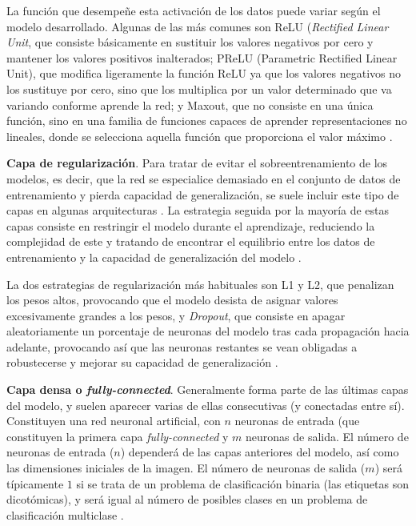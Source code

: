 La función que desempeñe esta activación de los datos puede variar según el modelo desarrollado. Algunas de las más comunes son ReLU (\textit{Rectified Linear Unit}, que consiste básicamente en sustituir los valores negativos por cero y mantener los valores positivos inalterados; PReLU (Parametric Rectified Linear Unit), que modifica ligeramente la función ReLU ya que los valores negativos no los sustituye por cero, sino que los multiplica por un valor determinado que va variando conforme aprende la red; y Maxout, que no consiste en una única función, sino en una familia de funciones capaces de aprender representaciones no lineales, donde se selecciona aquella función que proporciona el valor máximo \cite{cnn:gu, cnn:cheatsheet}.

\textbf{Capa de regularización}. Para tratar de evitar el sobreentrenamiento de los modelos, es decir, que la red se especialice demasiado en el conjunto de datos de entrenamiento y pierda capacidad de generalización, se suele incluir este tipo de capas en algunas arquitecturas \cite{cnn:gu}. La estrategia seguida por la mayoría de estas capas consiste en restringir el modelo durante el aprendizaje, reduciendo la complejidad de este y tratando de encontrar el equilibrio entre los datos de entrenamiento y la capacidad de generalización del modelo \cite{cnn:biblia_deeplearning}.

La dos estrategias de regularización más habituales son L1 y L2, que penalizan los pesos altos, provocando que el modelo desista de asignar valores excesivamente grandes a los pesos, y \textit{Dropout}, que consiste en apagar aleatoriamente un porcentaje de neuronas del modelo tras cada propagación hacia adelante, provocando así que las neuronas restantes se vean obligadas a robustecerse y mejorar su capacidad de generalización \cite{cnn:biblia_deeplearning}.

\textbf{Capa densa o \textit{fully-connected}}. Generalmente forma parte de las últimas capas del modelo, y suelen aparecer varias de ellas consecutivas (y conectadas entre sí). Constituyen una red neuronal artificial, con $n$ neuronas de entrada (que constituyen la primera capa \textit{fully-connected} y $m$ neuronas de salida. El número de neuronas de entrada ($n$) dependerá de las capas anteriores del modelo, así como las dimensiones iniciales de la imagen. El número de neuronas de salida ($m$) será típicamente $1$ si se trata de un problema de clasificación binaria (las etiquetas son dicotómicas), y será igual al número de posibles clases en un problema de clasificación multiclase \cite{cnn:ieee, cnn:osea}.

